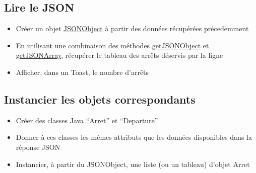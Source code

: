 \documentclass{article}
\begin{document}
\subsection{Lire le JSON}
\begin{itemize} 
  \item Créer un objet
  \href{http://developer.android.com/reference/org/json/JSONObject.html}{JSONObject}
  à partir des données récupérées précedemment
  \item En utilisant une combinaison des méthodes
  \href{http://developer.android.com/reference/org/json/JSONObject.html#getJSONObject(java.lang.String)}{getJSONObject}
  et 
  \href{http://developer.android.com/reference/org/json/JSONObject.html#getJSONArray(java.lang.String)}{getJSONArray}, récupérer le tableau des arrêts déservis par la ligne
  \item Afficher, dans un Toast, le nombre d'arrêts
\end{itemize}
\subsection{Instancier les objets correspondants}
\begin{itemize} 
  \item Créer des classes Java ``Arret'' et ``Departure''
  \item Donner à ces classes les mêmes attributs que les données disponibles
  dans la réponse JSON
  \item Instancier, à partir du JSONObject, une liste (ou un tableau) d'objet
  Arret
\end{itemize}
\end{document}
